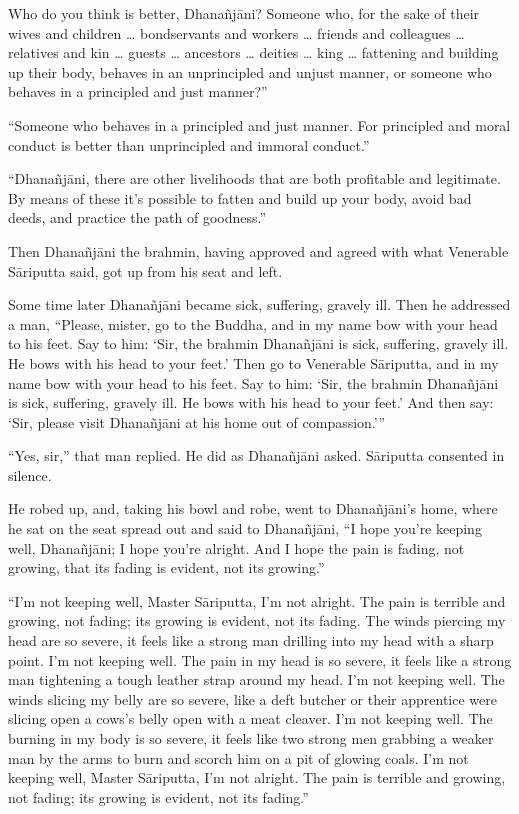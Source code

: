 \documentclass[12pt,openany]{book}%
\begin{document}
Who do you think is better, \textsanskrit{Dhanañjāni}? Someone who, for the sake of their wives and children … bondservants and workers … friends and colleagues … relatives and kin … guests … ancestors … deities … king … fattening and building up their body, behaves in an unprincipled and unjust manner, or someone who behaves in a principled and just manner?” 

“Someone who behaves in a principled and just manner. For principled and moral conduct is better than unprincipled and immoral conduct.” 

“\textsanskrit{Dhanañjāni}, there are other livelihoods that are both profitable and legitimate. By means of these it’s possible to fatten and build up your body, avoid bad deeds, and practice the path of goodness.” 

Then \textsanskrit{Dhanañjāni} the brahmin, having approved and agreed with what Venerable \textsanskrit{Sāriputta} said, got up from his seat and left. 

Some time later \textsanskrit{Dhanañjāni} became sick, suffering, gravely ill. Then he addressed a man, “Please, mister, go to the Buddha, and in my name bow with your head to his feet. Say to him: ‘Sir, the brahmin \textsanskrit{Dhanañjāni} is sick, suffering, gravely ill. He bows with his head to your feet.’ Then go to Venerable \textsanskrit{Sāriputta}, and in my name bow with your head to his feet. Say to him: ‘Sir, the brahmin \textsanskrit{Dhanañjāni} is sick, suffering, gravely ill. He bows with his head to your feet.’ And then say: ‘Sir, please visit \textsanskrit{Dhanañjāni} at his home out of compassion.’” 

“Yes, sir,” that man replied. He did as \textsanskrit{Dhanañjāni} asked. \textsanskrit{Sāriputta} consented in silence. 

He robed up, and, taking his bowl and robe, went to \textsanskrit{Dhanañjāni}’s home, where he sat on the seat spread out and said to \textsanskrit{Dhanañjāni}, “I hope you’re keeping well, \textsanskrit{Dhanañjāni}; I hope you’re alright. And I hope the pain is fading, not growing, that its fading is evident, not its growing.” 

“I’m not keeping well, Master \textsanskrit{Sāriputta}, I’m not alright. The pain is terrible and growing, not fading; its growing is evident, not its fading. The winds piercing my head are so severe, it feels like a strong man drilling into my head with a sharp point. I’m not keeping well. The pain in my head is so severe, it feels like a strong man tightening a tough leather strap around my head. I’m not keeping well. The winds slicing my belly are so severe, like a deft butcher or their apprentice were slicing open a cows’s belly open with a meat cleaver. I’m not keeping well. The burning in my body is so severe, it feels like two strong men grabbing a weaker man by the arms to burn and scorch him on a pit of glowing coals. I’m not keeping well, Master \textsanskrit{Sāriputta}, I’m not alright. The pain is terrible and growing, not fading; its growing is evident, not its fading.” 
\end{document}
